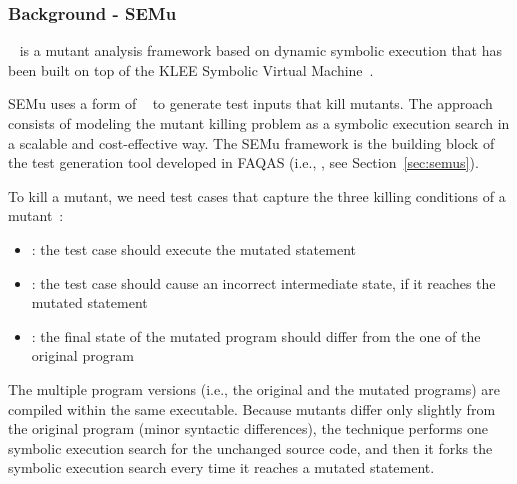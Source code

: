 
\subsubsection{Background - SEMu}
\label{klee-semu}

\STARTCHANGEDWPT

~\cite{chekam2021killing} is a mutant analysis  framework based on dynamic symbolic execution that has been built on top of the KLEE Symbolic Virtual Machine~\cite{cadar2008klee}.

SEMu uses a form of ~\cite{person2008differential} to generate test inputs that kill mutants. The approach consists of modeling the mutant killing problem as a symbolic execution search in a scalable and cost-effective way. 
The SEMu framework is the building block of 
the test generation tool developed in FAQAS (i.e., , see Section~\ref{sec:semus}).

To kill a mutant, we need test cases that capture the three killing conditions of a mutant~\cite{offutt1997automatically}: 
\begin{itemize}
	\item {}: the test case should execute the mutated statement
	\item {}: the test case should cause an incorrect intermediate state, if it reaches the mutated statement
	\item {}: the final state of the mutated program should differ from the one of the original program
\end{itemize}


The multiple program versions (i.e., the original and the mutated programs) are compiled within the same executable. 
Because mutants differ only slightly from the original program (minor syntactic differences), the technique performs one symbolic execution search for the unchanged source code, and then it forks the symbolic execution search every time it reaches a mutated statement.




